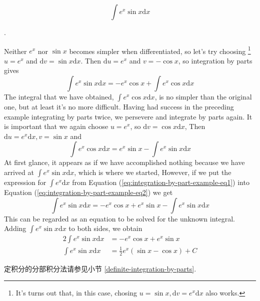 \begin{example}
    \[
        \int e^x \sin x \mathrm dx
    \]

    \cite[page 488]{stewart}.

    Neither $e^x$ nor $\sin x$ becomes simpler when differentiated,
    so let's try choosing
    \footnote{It's turns out that, in this case, chosing $u = \sin x, \mathrm dv = e^x \mathrm dx$ also works.}
    $u = e^x$ and $\mathrm dv = \sin x \mathrm dx$. 
    Then $\mathrm du = e^x$ and $v = -\cos x$, so integration by parts gives
    \begin{equation}
        \label{eq:integration-by-part-example-eq2}
        \int e^x \sin x\mathrm dx = -e^x \cos x + \int e^x \cos x \mathrm dx
    \end{equation}
    The integral that we have obtained, $\int e^x \cos x \mathrm dx$, 
    is no simpler than the original one, but at least it's no more difficult.
     Having had success in the preceding example integrating
    by parts twice, we persevere and integrate by parts again. It is important that we again
    choose $u = e^x$, so $\mathrm dv = \cos x \mathrm dx$, 
    Then $\mathrm du = e^x \mathrm dx, v = \sin x$ and
    \begin{equation}
        \label{eq:integration-by-part-example-eq1}
        \int e^x \cos x \mathrm dx = e^x \sin x - \int e^x \sin x \mathrm dx
    \end{equation}
    At first glance, it appears as if we have accomplished nothing because we have arrived
    at $\int e^x \sin x \mathrm dx$, which is where we started, 
    However, if we put the expression for $\int e^x \mathrm dx$ 
    from Equation (\ref{eq:integration-by-part-example-eq1}) 
    into Equation (\ref{eq:integration-by-part-example-eq2}) 
    we get
    \begin{equation*}
        \int e^x \sin x \mathrm dx = -e^x \cos x + e^x \sin x - \int e^x \sin x \mathrm dx 
    \end{equation*}
    This can be regarded as an equation to be solved for the unknown integral. Adding
    $\int e^x \sin x\mathrm dx$ to both sides, we obtain
    \begin{align*}
        2 \int e^x \sin x \mathrm dx &= -e^x \cos x + e^x \sin x  \\
        \int e^x \sin x \mathrm dx &= \frac{1}{2} e^x (\sin x - \cos x) + C
    \end{align*}
\end{example}

定积分的分部积分法请参见小节 \ref{definite-integration-by-parts}.

